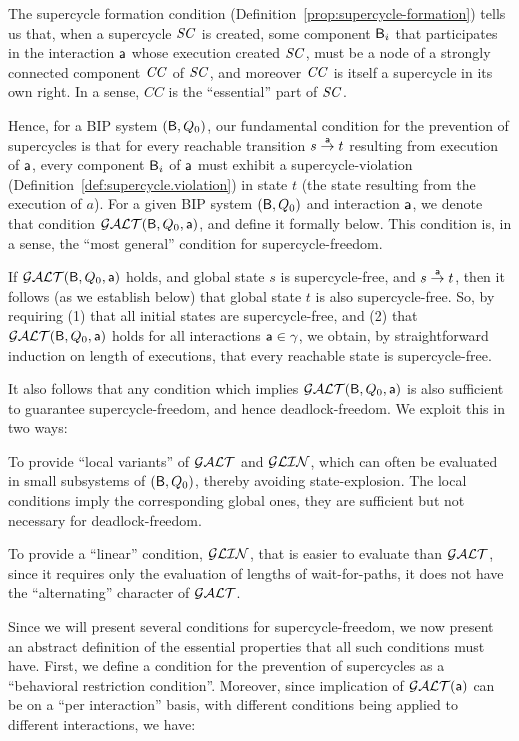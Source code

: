 
The supercycle formation condition (Definition~\ref{prop:supercycle-formation}) tells us that, when a supercycle $\SC$ is
created, some component $\B_i$ that participates in the interaction $\act$ whose execution created $\SC$, must be a node
of a strongly connected component $\CC$ of $\SC$, and moreover $\CC$ is itself a supercycle in its own right. In a sense,
$CC$ is the ``essential'' part of $\SC$.

Hence, for a BIP system $(\B, Q_0)$, our fundamental condition for the prevention of supercycles is that 
for every reachable transition  $s \goesto[\act] t$ resulting from execution of $\act$, 
every component $\B_i$ of $\act$
must exhibit a supercycle-violation (Definition~\ref{def:supercycle.violation}) in state $t$ (the state resulting
from the execution of $a$). For a given BIP system $(\B, Q_0)$ and interaction $\act$, we denote that condition $\GAO(\B, Q_0, \act)$, and define it formally below.
This condition is, in a sense, the ``most general'' condition for supercycle-freedom.

If $\GAO(\B, Q_0, \act)$ holds, and global state $s$ is supercycle-free, and $s \goesto[\act] t$, then it follows (as
we establish below) that global state $t$ is also supercycle-free. 
So, by requiring (1) that all initial states are supercycle-free, and
(2) that $\GAO(\B, Q_0, \act)$ holds for all interactions $\act \in \gamma$, we
obtain, by straightforward induction on length of executions, that every reachable state is supercycle-free.

It also follows that any condition which implies $\GAO(\B, Q_0, \act)$ is also sufficient to guarantee  supercycle-freedom, and
hence deadlock-freedom. We exploit this in two ways:
\bn

\item To provide ``local variants'' of $\GAO$ and $\GLin$,  which can often be
evaluated in small subsystems of $(\B, Q_0)$, thereby avoiding state-explosion. The local conditions imply the
corresponding global ones, \ie they are sufficient but not necessary for deadlock-freedom.

\item To provide a ``linear'' condition, $\GLin$, that is easier to evaluate than $\GAO$, since it requires only the
evaluation of lengths of wait-for-paths, \ie it does not have the ``alternating'' character of $\GAO$. 

\en

Since we will present several conditions for supercycle-freedom, we now present an abstract definition of the essential
properties that all such conditions must have. First, we define a condition for the prevention of supercycles as a 
``behavioral restriction condition''. Moreover, since implication of $\GAO(\act)$ can be on a ``per interaction'' basis,
with different conditions being applied to different interactions, we have:


